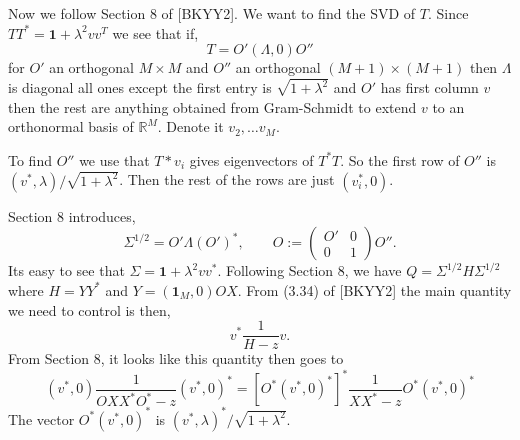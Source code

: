 \documentclass[11 pt, reqno]{article}
\def\beq{\begin{equation}}
\def\eeq{\end{equation}}
\def\rr{\mathbb{R}}
\def\1{\boldsymbol{1}}
\begin{document}
Now we follow Section $8$ of [BKYY2].  We want to find the SVD of $T$.   Since $T T^* = \1 + \lambda^2 v v^T$ we see that if,
\beq
T = O' (\Lambda, 0) O''
\eeq
for $O'$ an orthogonal $M \times M$ and $O''$ an orthogonal $(M+1) \times (M+1)$ then $\Lambda$ is diagonal all ones except the first entry is $\sqrt{1+ \lambda^2}$ and $O'$ has first column $v$ then the rest are anything obtained from Gram-Schmidt to extend $v$ to an orthonormal basis of $\rr^M$.  Denote it $v_2, \dots v_M$.  

To find $O''$ we use that $T* v_i$ gives eigenvectors of $T^* T$.   So the first row of $O''$ is $(v^*, \lambda ) / \sqrt{1+\lambda^2}$.  Then the rest of the rows are just $(v_i^*, 0)$.

Section 8 introduces,
\beq
\Sigma^{1/2} = O' \Lambda (O')^*, \qquad O:= \left( \begin{matrix} O' & 0 \\ 0 & 1 \end{matrix} \right)O''.
\eeq
Its easy to see that $\Sigma = \1 + \lambda^2 v v^*$.  Following Section 8, we have $Q = \Sigma^{1/2} H \Sigma^{1/2}$ where $H = Y Y^*$ and $Y = (\1_M, 0) O X$.  
From (3.34) of [BKYY2] the main quantity we need to control is then,
\beq
v^* \frac{1}{H-z} v.
\eeq
From Section 8, it looks like this quantity then goes to
\beq
(v^*, 0) \frac{1}{ O X X^* O^* - z } (v^*, 0)^* = [ O^* ( v^*, 0)^*]^* \frac{1}{ X X^* - z } O^* ( v^*, 0)^*
\eeq
The vector $O^* (v^*, 0)^*$ is $(v^*, \lambda)^* / \sqrt{1  + \lambda^2}$.  







{}


\begin{comment}
\begin{thebibliography}{9999}
\bibitem[EKYY]{EKYY} Erdos-Knowles-Yau-Yin.  Semicircle for general class




\end{thebibliography}
\end{comment}
\end{document}
